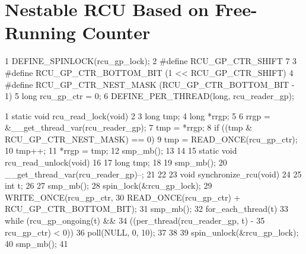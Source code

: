 \section{Nestable RCU Based on Free-Running Counter}
\label{sec:app:toyrcu:Nestable RCU Based on Free-Running Counter}

\begin{listing}[tb]
{ \scriptsize
\begin{verbbox}
  1 DEFINE_SPINLOCK(rcu_gp_lock);
  2 #define RCU_GP_CTR_SHIFT 7
  3 #define RCU_GP_CTR_BOTTOM_BIT (1 << RCU_GP_CTR_SHIFT)
  4 #define RCU_GP_CTR_NEST_MASK (RCU_GP_CTR_BOTTOM_BIT - 1)
  5 long rcu_gp_ctr = 0;
  6 DEFINE_PER_THREAD(long, rcu_reader_gp);
\end{verbbox}
}
\centering
\theverbbox
\caption{Data for Nestable RCU Using a Free-Running Counter}
\label{lst:app:toyrcu:Data for Nestable RCU Using a Free-Running Counter}
\end{listing}

\begin{listing}[tb]
{ \scriptsize
\begin{verbbox}
 1 static void rcu_read_lock(void)
 2 {
 3   long tmp;
 4   long *rrgp;
 5 
 6   rrgp = &__get_thread_var(rcu_reader_gp);
 7   tmp = *rrgp;
 8   if ((tmp & RCU_GP_CTR_NEST_MASK) == 0)
 9     tmp = READ_ONCE(rcu_gp_ctr);
10   tmp++;
11   *rrgp = tmp;
12   smp_mb();
13 }
14 
15 static void rcu_read_unlock(void)
16 {
17   long tmp;
18 
19   smp_mb();
20   __get_thread_var(rcu_reader_gp)--;
21 }
22 
23 void synchronize_rcu(void)
24 {
25   int t;
26 
27   smp_mb();
28   spin_lock(&rcu_gp_lock);
29   WRITE_ONCE(rcu_gp_ctr,
30     READ_ONCE(rcu_gp_ctr) + RCU_GP_CTR_BOTTOM_BIT);
31   smp_mb();
32   for_each_thread(t) {
33     while (rcu_gp_ongoing(t) &&
34            ((per_thread(rcu_reader_gp, t) -
35              rcu_gp_ctr) < 0)) {
36       poll(NULL, 0, 10);
37     }
38   }
39   spin_unlock(&rcu_gp_lock);
40   smp_mb();
41 }
\end{verbbox}
}
\centering
\theverbbox
\caption{Nestable RCU Using a Free-Running Counter}
\label{lst:app:toyrcu:Nestable RCU Using a Free-Running Counter}
\end{listing}

